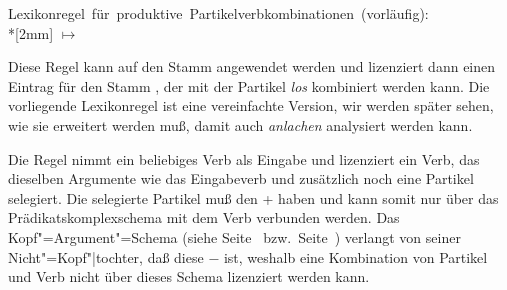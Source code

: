\eas
\label{lr-pv-prel}%
\mbox{Lexikonregel für produktive Partikelverbkombinationen (vorläufig):}\\*[2mm]
\onems[stem]{
           synsem \ibox{1} \onems{ loc$|$cat \ms{ head & \textit{verb\/} \\ 
                                                  subcat & \ibox{2}\\
}
                                 } \\
         }  $\mapsto$ \\
%
%
\zs

\noindent
Diese Regel kann auf den Stamm  angewendet werden
und lizenziert dann einen Eintrag für den Stamm , der mit der Partikel \emph{los}
kombiniert werden kann. Die vorliegende Lexikonregel ist eine vereinfachte Version, wir
werden später sehen, wie sie erweitert werden muß, damit auch \emph{anlachen}
analysiert werden kann.


Die Regel nimmt ein beliebiges Verb als Eingabe und lizenziert ein Verb,
das dieselben Argumente wie das Eingabeverb und zusätzlich noch eine Partikel selegiert.
Die selegierte Partikel muß den \lexw + haben und kann somit nur über
das Prädikatskomplexschema mit dem Verb verbunden werden. Das Kopf"=Argument"=Schema
(siehe Seite~\pageref{schema-bin} bzw.\ Seite~\pageref{schema-bin-mark-final}) verlangt von seiner
Nicht"=Kopf"|tochter, daß diese \lex$-$ ist, weshalb eine Kombination von Partikel und Verb nicht
über dieses Schema lizenziert werden kann.

